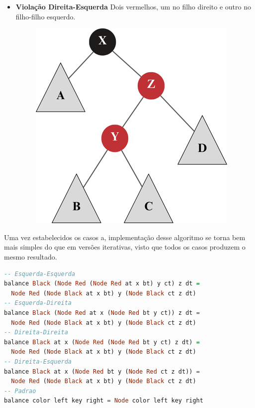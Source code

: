 \begin{itemize}
\begin{figure}[!ht]
		      \caption{}
	      \end{figure}
	      \FloatBarrier
	\item \textbf{Violação Direita-Esquerda} Dois vermelhos, um no filho direito e outro no filho-filho esquerdo.
	      \begin{figure}[!ht]
		      \centering
		      \includegraphics[scale=0.5]{figures/rubro-negra/right-left.png}
		      \caption{}
	      \end{figure}
	      \FloatBarrier
\end{itemize}

\noindent
Uma vez estabelecidos os casos a, implementação desse algoritmo se torna bem mais simples do que em versões iterativas, visto que todos os casos produzem o mesmo resultado.

\begin{lstlisting}[language=haskell]
-- Esquerda-Esquerda
balance Black (Node Red (Node Red at x bt) y ct) z dt =
  Node Red (Node Black at x bt) y (Node Black ct z dt)
-- Esquerda-Direita
balance Black (Node Red at x (Node Red bt y ct)) z dt =
  Node Red (Node Black at x bt) y (Node Black ct z dt)
-- Direita-Direita
balance Black at x (Node Red (Node Red bt y ct) z dt) =
  Node Red (Node Black at x bt) y (Node Black ct z dt)
-- Direita-Esquerda
balance Black at x (Node Red bt y (Node Red ct z dt)) =
  Node Red (Node Black at x bt) y (Node Black ct z dt)
-- Padrao
balance color left key right = Node color left key right
\end{lstlisting}
\FloatBarrier

